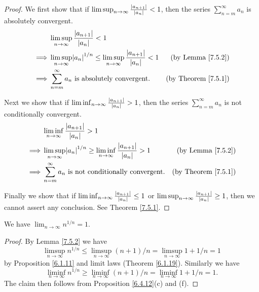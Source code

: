 \begin{proof}
    We first show that if \(\limsup_{n \to \infty} \frac{\abs*{a_{n + 1}}}{\abs*{a_n}} < 1\), then the series \(\sum_{n = m}^\infty a_n\) is absolutely convergent.
    \begin{align*}
                 & \limsup_{n \to \infty} \frac{\abs*{a_{n + 1}}}{\abs*{a_n}} < 1                                                                                   \\
        \implies & \limsup_{n \to \infty} \abs*{a_n}^{1 / n} \leq \limsup_{n \to \infty} \frac{\abs*{a_{n + 1}}}{\abs*{a_n}} < 1 & \text{(by Lemma \ref{7.5.2})}   \\
        \implies & \sum_{n = m}^\infty a_n \text{ is absolutely convergent}.                                                       & \text{(by Theorem \ref{7.5.1})}
    \end{align*}

    Next we show that if \(\liminf_{n \to \infty} \frac{\abs*{a_{n + 1}}}{\abs*{a_n}} > 1\), then the series \(\sum_{n = m}^\infty a_n\) is not conditionally convergent.
    \begin{align*}
                 & \liminf_{n \to \infty} \frac{\abs*{a_{n + 1}}}{\abs*{a_n}} > 1                                                                                   \\
        \implies & \limsup_{n \to \infty} \abs*{a_n}^{1 / n} \geq \liminf_{n \to \infty} \frac{\abs*{a_{n + 1}}}{\abs*{a_n}} > 1 & \text{(by Lemma \ref{7.5.2})}   \\
        \implies & \sum_{n = m}^\infty a_n \text{ is not conditionally convergent}.                                                & \text{(by Theorem \ref{7.5.1})}
    \end{align*}

    Finally we show that if \(\liminf_{n \to \infty} \frac{\abs*{a_{n + 1}}}{\abs*{a_n}} \leq 1\) or \(\limsup_{n \to \infty} \frac{\abs*{a_{n + 1}}}{\abs*{a_n}} \geq 1\), then we cannot assert any conclusion.
    See Theorem \ref{7.5.1}.
\end{proof}

\begin{proposition}\label{7.5.4}
    We have \(\lim_{n \to \infty} n^{1 / n} = 1\).
\end{proposition}

\begin{proof}
    By Lemma \ref{7.5.2} we have
    \[
        \limsup_{n \to \infty} n^{1 / n} \leq \limsup_{n \to \infty} (n + 1) / n = \limsup_{n \to \infty} 1 + 1 / n = 1
    \]
    by Proposition \ref{6.1.11} and limit laws (Theorem \ref{6.1.19}).
    Similarly we have
    \[
        \liminf_{n \to \infty} n^{1 / n} \geq \liminf_{n \to \infty} (n + 1) / n = \liminf_{n \to \infty} 1 + 1 / n = 1.
    \]
    The claim then follows from Proposition \ref{6.4.12}(c) and (f).
\end{proof}

